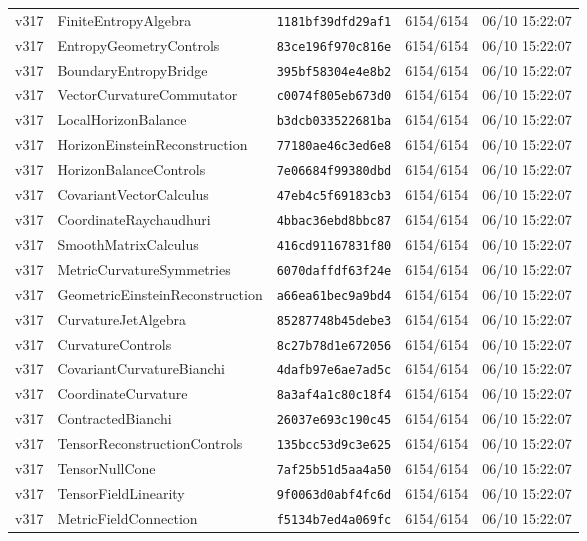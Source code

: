 \documentclass[11pt]{article}
\theoremstyle{definition}\newtheorem{deriv}{Derivation}
\begin{document}
{\begin{longtable}{@{}lllll@{}}
v317 & FiniteEntropyAlgebra & \texttt{1181bf39dfd29af1} & 6154/6154 & 06/10 15:22:07 \\
v317 & EntropyGeometryControls & \texttt{83ce196f970c816e} & 6154/6154 & 06/10 15:22:07 \\
v317 & BoundaryEntropyBridge & \texttt{395bf58304e4e8b2} & 6154/6154 & 06/10 15:22:07 \\
v317 & VectorCurvatureCommutator & \texttt{c0074f805eb673d0} & 6154/6154 & 06/10 15:22:07 \\
v317 & LocalHorizonBalance & \texttt{b3dcb033522681ba} & 6154/6154 & 06/10 15:22:07 \\
v317 & HorizonEinsteinReconstruction & \texttt{77180ae46c3ed6e8} & 6154/6154 & 06/10 15:22:07 \\
v317 & HorizonBalanceControls & \texttt{7e06684f99380dbd} & 6154/6154 & 06/10 15:22:07 \\
v317 & CovariantVectorCalculus & \texttt{47eb4c5f69183cb3} & 6154/6154 & 06/10 15:22:07 \\
v317 & CoordinateRaychaudhuri & \texttt{4bbac36ebd8bbc87} & 6154/6154 & 06/10 15:22:07 \\
v317 & SmoothMatrixCalculus & \texttt{416cd91167831f80} & 6154/6154 & 06/10 15:22:07 \\
v317 & MetricCurvatureSymmetries & \texttt{6070daffdf63f24e} & 6154/6154 & 06/10 15:22:07 \\
v317 & GeometricEinsteinReconstruction & \texttt{a66ea61bec9a9bd4} & 6154/6154 & 06/10 15:22:07 \\
v317 & CurvatureJetAlgebra & \texttt{85287748b45debe3} & 6154/6154 & 06/10 15:22:07 \\
v317 & CurvatureControls & \texttt{8c27b78d1e672056} & 6154/6154 & 06/10 15:22:07 \\
v317 & CovariantCurvatureBianchi & \texttt{4dafb97e6ae7ad5c} & 6154/6154 & 06/10 15:22:07 \\
v317 & CoordinateCurvature & \texttt{8a3af4a1c80c18f4} & 6154/6154 & 06/10 15:22:07 \\
v317 & ContractedBianchi & \texttt{26037e693c190c45} & 6154/6154 & 06/10 15:22:07 \\
v317 & TensorReconstructionControls & \texttt{135bcc53d9c3e625} & 6154/6154 & 06/10 15:22:07 \\
v317 & TensorNullCone & \texttt{7af25b51d5aa4a50} & 6154/6154 & 06/10 15:22:07 \\
v317 & TensorFieldLinearity & \texttt{9f0063d0abf4fc6d} & 6154/6154 & 06/10 15:22:07 \\
v317 & MetricFieldConnection & \texttt{f5134b7ed4a069fc} & 6154/6154 & 06/10 15:22:07 \\

\end{longtable}}
\end{document}
